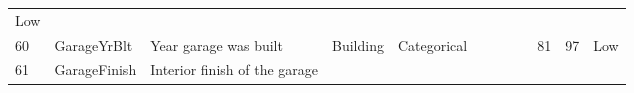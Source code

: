 \documentclass[11pt]{article}
\begin{document}
\begin{longtable}[]{@{}llllllllllll@{}}
\begin{minipage}[t]{0.04\columnwidth}
Low\strut
\end{minipage}\tabularnewline
\begin{minipage}[t]{0.04\columnwidth}\raggedright\strut
60\strut
\end{minipage} & \begin{minipage}[t]{0.04\columnwidth}\raggedright\strut
GarageYrBlt\strut
\end{minipage} & \begin{minipage}[t]{0.04\columnwidth}\raggedright\strut
Year garage was built\strut
\end{minipage} & \begin{minipage}[t]{0.04\columnwidth}\raggedright\strut
Building\strut
\end{minipage} & \begin{minipage}[t]{0.04\columnwidth}\raggedright\strut
Categorical\strut
\end{minipage} & \begin{minipage}[t]{0.04\columnwidth}\raggedright\strut
\strut
\end{minipage} & \begin{minipage}[t]{0.04\columnwidth}\raggedright\strut
\strut
\end{minipage} & \begin{minipage}[t]{0.04\columnwidth}\raggedright\strut
\strut
\end{minipage} & \begin{minipage}[t]{0.04\columnwidth}\raggedright\strut
\strut
\end{minipage} & \begin{minipage}[t]{0.04\columnwidth}\raggedright\strut
81\strut
\end{minipage} & \begin{minipage}[t]{0.04\columnwidth}\raggedright\strut
97\strut
\end{minipage} & \begin{minipage}[t]{0.04\columnwidth}\raggedright\strut
Low\strut
\end{minipage}\tabularnewline
\begin{minipage}[t]{0.04\columnwidth}\raggedright\strut
61\strut
\end{minipage} & \begin{minipage}[t]{0.04\columnwidth}\raggedright\strut
GarageFinish\strut
\end{minipage} & \begin{minipage}[t]{0.04\columnwidth}\raggedright\strut
Interior finish of the garage\strut
\end{minipage} & \begin{minipage}[t]{0.04\columnwidth}\raggedright\strut

\end{minipage}
\end{longtable}
\end{document}
